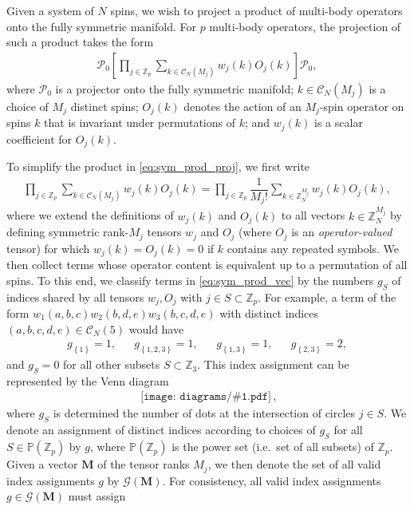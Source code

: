 \documentclass[nofootinbib,notitlepage,11pt]{revtex4-2}
\newcommand{\f}[2]{\dfrac{#1}{#2}} %
\newcommand{\p}[1]{\left(#1\right)} %
\renewcommand{\sp}[1]{\left[#1\right]} %
\renewcommand{\set}[1]{\left\{#1\right\}} %
\newcommand{\m}{\bm} %
\newcommand{\1}{\mathds{1}}
\newcommand{\C}{\mathcal{C}}
\newcommand{\G}{\mathcal{G}}
\renewcommand{\P}{\mathcal{P}}
\newcommand{\PP}{\mathbb{P}}
\newcommand{\ZZ}{\mathbb{Z}}
\newcommand{\diagram}[1]
{\,\texttt{[image: diagrams/\#1.pdf]}\,}
\begin{document}
Given a system of $N$ spins, we wish to project a product of
multi-body operators onto the fully symmetric manifold.  For $p$
multi-body operators, the projection of such a product takes the form
\begin{align}
  \P_0 \sp{\prod_{j\in\ZZ_p}
    \sum_{k\in\C_N\p{M_j}} w_j\p{k} O_j\p{k}} \P_0,
  \label{eq:sym_prod_proj}
\end{align}
where $\P_0$ is a projector onto the fully symmetric manifold;
$k\in\C_N\p{M_j}$ is a choice of $M_j$ distinct spins; $O_j\p{k}$
denotes the action of an $M_j$-spin operator on spins $k$ that is
invariant under permutations of $k$; and $w_j\p{k}$ is a scalar
coefficient for $O_j\p{k}$.

To simplify the product in \eqref{eq:sym_prod_proj}, we first write
\begin{align}
  \prod_{j\in\ZZ_p} \sum_{k\in\C_N\p{M_j}} w_j\p{k} O_j\p{k}
  = \prod_{j\in\ZZ_p} \f1{M_j!} \sum_{k\in\ZZ_N^{M_j}}
  w_j\p{k} O_j\p{k},
  \label{eq:sym_prod_vec}
\end{align}
where we extend the definitions of $w_j\p{k}$ and $O_j\p{k}$ to all
vectors $k\in\ZZ_N^{M_j}$ by defining symmetric rank-$M_j$ tensors
$w_j$ and $O_j$ (where $O_j$ is an {\it operator-valued} tensor) for
which $w_j\p{k}=O_j\p{k}=0$ if $k$ contains any repeated symbols.  We
then collect terms whose operator content is equivalent up to a
permutation of all spins.  To this end, we classify terms in
\eqref{eq:sym_prod_vec} by the numbers $g_S$ of indices shared by all
tensors $w_j,O_j$ with $j\in S\subset\ZZ_p$.  For example, a term of
the form $w_1\p{a,b,c} w_2\p{b,d,e} w_3\p{b,c,d,e}$ with distinct
indices $\p{a,b,c,d,e}\in\C_N\p{5}$ would have
\begin{align}
  g_{\set{1}} = 1,
  &&
  g_{\set{1,2,3}} = 1,
  &&
  g_{\set{1,3}} = 1,
  &&
  g_{\set{2,3}} = 2,
\end{align}
and $g_S=0$ for all other subsets $S\subset\ZZ_3$.  This index
assignment can be represented by the Venn diagram
\begin{align}
  \diagram{example},
  \label{eq:venn_diagram}
\end{align}
where $g_S$ is determined the number of dots at the intersection of
circles $j\in S$.  We denote an assignment of distinct indices
according to choices of $g_S$ for all $S\in\PP\p{\ZZ_p}$ by $g$, where
$\PP\p{\ZZ_p}$ is the power set (i.e.~set of all subsets) of $\ZZ_p$.
Given a vector $\m M$ of the tensor ranks $M_j$, we then denote the
set of all valid index assignments $g$ by $\G\p{\m M}$.  For
consistency, all valid index assignments $g\in\G\p{\m M}$ must assign
\end{document}
